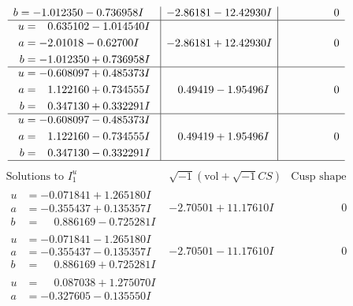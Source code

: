 \documentclass[1p]{elsarticle_modified}
\theoremstyle{definition}
\newcommand{\I}{\sqrt{-1}}
\begin{document}
$$\begin{array}{c|c|c}
\begin{aligned}
b &= -1.012350 - 0.736958 I\end{aligned}
 & -2.86181 - 12.42930 I & \phantom{-0.000000 } 0 \\ \hline\begin{aligned}
u &= \phantom{-}0.635102 - 1.014540 I \\
a &= -2.01018 - 0.62700 I \\
b &= -1.012350 + 0.736958 I\end{aligned}
 & -2.86181 + 12.42930 I & \phantom{-0.000000 } 0 \\ \hline\begin{aligned}
u &= -0.608097 + 0.485373 I \\
a &= \phantom{-}1.122160 + 0.734555 I \\
b &= \phantom{-}0.347130 + 0.332291 I\end{aligned}
 & \phantom{-}0.49419 - 1.95496 I & \phantom{-0.000000 } 0 \\ \hline\begin{aligned}
u &= -0.608097 - 0.485373 I \\
a &= \phantom{-}1.122160 - 0.734555 I \\
b &= \phantom{-}0.347130 - 0.332291 I\end{aligned}
 & \phantom{-}0.49419 + 1.95496 I & \phantom{-0.000000 } 0\\
 \hline 
 \end{array}$$\newpage$$\begin{array}{c|c|c}  
\text{Solutions to }I^u_{1}& \I (\text{vol} + \sqrt{-1}CS) & \text{Cusp shape}\\
 \hline 
\begin{aligned}
u &= -0.071841 + 1.265180 I \\
a &= -0.355437 + 0.135357 I \\
b &= \phantom{-}0.886169 - 0.725281 I\end{aligned}
 & -2.70501 + 11.17610 I & \phantom{-0.000000 } 0 \\ \hline\begin{aligned}
u &= -0.071841 - 1.265180 I \\
a &= -0.355437 - 0.135357 I \\
b &= \phantom{-}0.886169 + 0.725281 I\end{aligned}
 & -2.70501 - 11.17610 I & \phantom{-0.000000 } 0 \\ \hline\begin{aligned}
u &= \phantom{-}0.087038 + 1.275070 I \\
a &= -0.327605 - 0.135550 I \\

\end{aligned}
\end{array}$$
\end{document}
